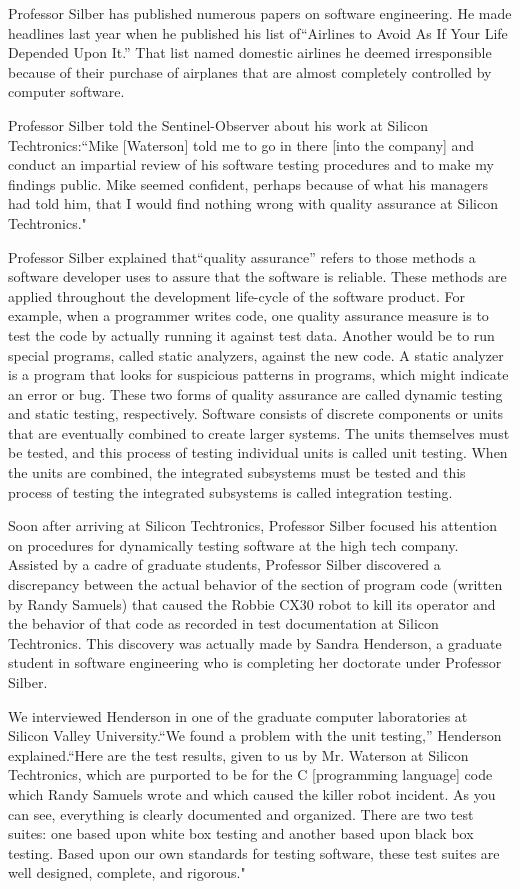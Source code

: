 Professor Silber has published numerous papers on software engineering. He made headlines last year when he published his list of``Airlines to Avoid As If Your Life Depended Upon It.'' That list named domestic airlines he deemed irresponsible because of their purchase of airplanes that are almost completely controlled by computer software.

Professor Silber told the Sentinel-Observer about his work at Silicon Techtronics:``Mike [Waterson] told me to go in there [into the company] and conduct an impartial review of his software testing procedures and to make my findings public. Mike seemed confident, perhaps because of what his managers had told him, that I would find nothing wrong with quality assurance at Silicon Techtronics."

Professor Silber explained that``quality assurance'' refers to those methods a software developer uses to assure that the software is reliable. These methods are applied throughout the development life-cycle of the software product. For example, when a programmer writes code, one quality assurance measure is to test the code by actually running it against test data. Another would be to run special programs, called static analyzers, against the new code. A static analyzer is a program that looks for suspicious patterns in programs, which might indicate an error or bug. These two forms of quality assurance are called dynamic testing and static testing, respectively. Software consists of discrete components or units that are eventually combined to create larger systems. The units themselves must be tested, and this process of testing individual units is called unit testing. When the units are combined, the integrated subsystems must be tested and this process of testing the integrated subsystems is called integration testing.

Soon after arriving at Silicon Techtronics, Professor Silber focused his attention on procedures for dynamically testing software at the high tech company. Assisted by a cadre of graduate students, Professor Silber discovered a discrepancy between the actual behavior of the section of program code (written by Randy Samuels) that caused the Robbie CX30 robot to kill its operator and the behavior of that code as recorded in test documentation at Silicon Techtronics. This discovery was actually made by Sandra Henderson, a graduate student in software engineering who is completing her doctorate under Professor Silber.

We interviewed Henderson in one of the graduate computer laboratories at Silicon Valley University.``We found a problem with the unit testing,'' Henderson explained.``Here are the test results, given to us by Mr. Waterson at Silicon Techtronics, which are purported to be for the C [programming language] code which Randy Samuels wrote and which caused the killer robot incident. As you can see, everything is clearly documented and organized. There are two test suites: one based upon white box testing and another based upon black box testing. Based upon our own standards for testing software, these test suites are well designed, complete, and rigorous."

